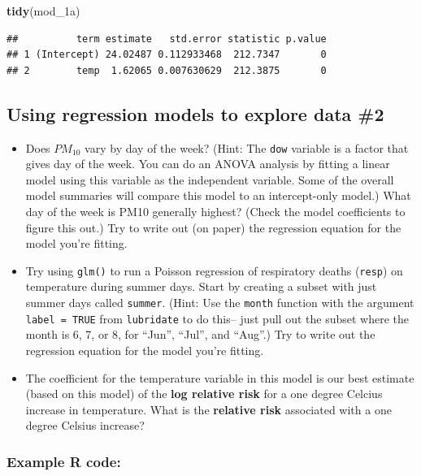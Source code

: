 \documentclass[]{book}
\makeatletter
\newenvironment{Shaded}{\begin{snugshade}}{\end{snugshade}}
\newcommand{\KeywordTok}[1]{\textcolor[rgb]{0.13,0.29,0.53}{\textbf{#1}}}
\newcommand{\NormalTok}[1]{#1}
\providecommand{\tightlist}{%
  \setlength{\itemsep}{0pt}\setlength{\parskip}{0pt}}
\newenvironment{kframe}{%
\medskip{}
\setlength{\fboxsep}{.8em}
 \def\at@end@of@kframe{}%
 \ifinner\ifhmode%
  \def\at@end@of@kframe{\end{minipage}}%
  \begin{minipage}{\columnwidth}%
 \fi\fi%
 \def\FrameCommand##1{\hskip\@totalleftmargin \hskip-\fboxsep
 \colorbox{shadecolor}{##1}\hskip-\fboxsep
     \hskip-\linewidth \hskip-\@totalleftmargin \hskip\columnwidth}%
 \MakeFramed {\advance\hsize-\width
   \@totalleftmargin\z@ \linewidth\hsize
   \@setminipage}}%
 {\par\unskip\endMakeFramed%
 \at@end@of@kframe}
\renewenvironment{Shaded}{\begin{kframe}}{\end{kframe}}
\theoremstyle{definition}
\theoremstyle{definition}
\theoremstyle{definition}
\theoremstyle{remark}
\makeatother
\begin{document}
\begin{Shaded}
\begin{Highlighting}[]
\KeywordTok{tidy}\NormalTok{(mod_1a)}
\end{Highlighting}
\end{Shaded}

\begin{verbatim}
##          term estimate   std.error statistic p.value
## 1 (Intercept) 24.02487 0.112933468  212.7347       0
## 2        temp  1.62065 0.007630629  212.3875       0
\end{verbatim}

\subsection{Using regression models to explore data
\#2}\label{using-regression-models-to-explore-data-2}

\begin{itemize}
\tightlist
\item
  Does \(PM_{10}\) vary by day of the week? (Hint: The \texttt{dow}
  variable is a factor that gives day of the week. You can do an ANOVA
  analysis by fitting a linear model using this variable as the
  independent variable. Some of the overall model summaries will compare
  this model to an intercept-only model.) What day of the week is PM10
  generally highest? (Check the model coefficients to figure this out.)
  Try to write out (on paper) the regression equation for the model
  you're fitting.
\item
  Try using \texttt{glm()} to run a Poisson regression of respiratory
  deaths (\texttt{resp}) on temperature during summer days. Start by
  creating a subset with just summer days called \texttt{summer}. (Hint:
  Use the \texttt{month} function with the argument
  \texttt{label\ =\ TRUE} from \texttt{lubridate} to do this-- just pull
  out the subset where the month is 6, 7, or 8, for ``Jun'', ``Jul'',
  and ``Aug''.) Try to write out the regression equation for the model
  you're fitting.
\item
  The coefficient for the temperature variable in this model is our best
  estimate (based on this model) of the \textbf{log relative risk} for a
  one degree Celcius increase in temperature. What is the
  \textbf{relative risk} associated with a one degree Celsius increase?
\end{itemize}

\subsubsection{Example R code:}\label{example-r-code-13}
\end{document}

